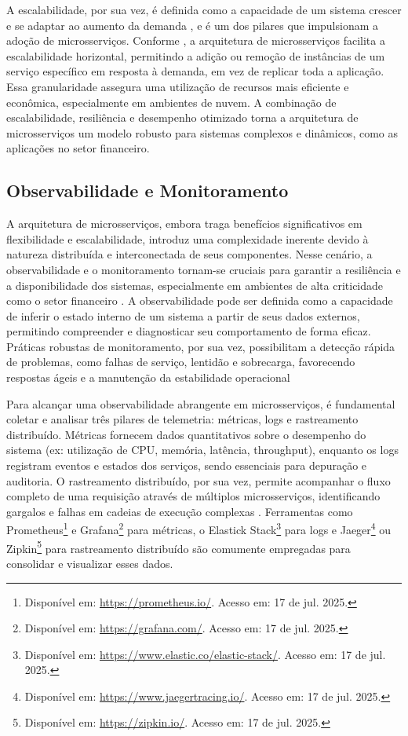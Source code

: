 A escalabilidade, por sua vez, é definida como a capacidade de um sistema crescer e se adaptar ao aumento da demanda \cite[p. 60]{fowler_microsservicos_2022}, e é um dos pilares que impulsionam a adoção de microsserviços. Conforme \cite{newman_building_2022}, a arquitetura de microsserviços facilita a escalabilidade horizontal, permitindo a adição ou remoção de instâncias de um serviço específico em resposta à demanda, em vez de replicar toda a aplicação. Essa granularidade assegura uma utilização de recursos mais eficiente e econômica, especialmente em ambientes de nuvem. A combinação de escalabilidade, resiliência e desempenho otimizado torna a arquitetura de microsserviços um modelo robusto para sistemas complexos e dinâmicos, como as aplicações no setor financeiro.

\subsection{Observabilidade e Monitoramento}

A arquitetura de microsserviços, embora traga benefícios significativos em flexibilidade e escalabilidade, introduz uma complexidade inerente devido à natureza distribuída e interconectada de seus componentes. Nesse cenário, a observabilidade e o monitoramento tornam-se cruciais para garantir a resiliência e a disponibilidade dos sistemas, especialmente em ambientes de alta criticidade como o setor financeiro \cite{arditti_microsservicos_2025}. A observabilidade pode ser definida como a capacidade de inferir o estado interno de um sistema a partir de seus dados externos, permitindo compreender e diagnosticar seu comportamento de forma eficaz. Práticas robustas de monitoramento, por sua vez, possibilitam a detecção rápida de problemas, como falhas de serviço, lentidão e sobrecarga, favorecendo respostas ágeis e a manutenção da estabilidade operacional \cite[p. 156]{fowler_microsservicos_2022}

Para alcançar uma observabilidade abrangente em microsserviços, é fundamental coletar e analisar três pilares de telemetria: métricas, logs e rastreamento distribuído. Métricas fornecem dados quantitativos sobre o desempenho do sistema (ex: utilização de CPU, memória, latência, throughput), enquanto os logs registram eventos e estados dos serviços, sendo essenciais para depuração e auditoria. O rastreamento distribuído, por sua vez, permite acompanhar o fluxo completo de uma requisição através de múltiplos microsserviços, identificando gargalos e falhas em cadeias de execução complexas  \cite{ibm_o_2023}. Ferramentas como Prometheus\footnote{Disponível em: \url{https://prometheus.io/}. Acesso em: 17 de jul. 2025.} e Grafana\footnote{Disponível em: \url{https://grafana.com/}. Acesso em: 17 de jul. 2025.} para métricas, o Elastick Stack\footnote{Disponível em: \url{https://www.elastic.co/elastic-stack/}. Acesso em: 17 de jul. 2025.} para logs e Jaeger\footnote{Disponível em: \url{https://www.jaegertracing.io/}. Acesso em: 17 de jul. 2025.} ou Zipkin\footnote{Disponível em: \url{https://zipkin.io/}. Acesso em: 17 de jul. 2025.} para rastreamento distribuído são comumente empregadas para consolidar e visualizar esses dados.

